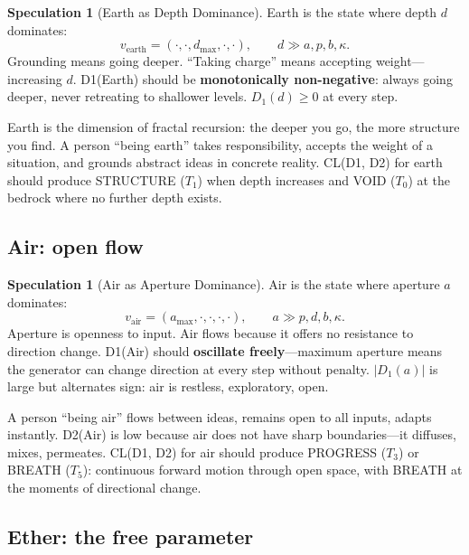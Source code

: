 \documentclass[11pt]{article}
\theoremstyle{definition}
\newtheorem{speculation}[theorem]{Speculation}
\theoremstyle{remark}
\begin{document}
\begin{speculation}[Earth as Depth Dominance]
\label{spec:earth}
Earth is the state where depth $d$ dominates:
\[
  v_{\text{earth}} = (\cdot, \cdot, d_{\max}, \cdot, \cdot), \qquad d \gg a, p, b, \kappa.
\]
Grounding means going deeper.  ``Taking charge'' means accepting weight---increasing
$d$.  D1(Earth) should be \textbf{monotonically non-negative}: always going deeper,
never retreating to shallower levels.  $D_1(d) \geq 0$ at every step.

Earth is the dimension of fractal recursion: the deeper you go, the more structure
you find.  A person ``being earth'' takes responsibility, accepts the weight of a
situation, and grounds abstract ideas in concrete reality.
CL(D1, D2) for earth should produce STRUCTURE ($T_1$) when depth increases and
VOID ($T_0$) at the bedrock where no further depth exists.
\end{speculation}

\subsection{Air: open flow}

\begin{speculation}[Air as Aperture Dominance]
\label{spec:air}
Air is the state where aperture $a$ dominates:
\[
  v_{\text{air}} = (a_{\max}, \cdot, \cdot, \cdot, \cdot), \qquad a \gg p, d, b, \kappa.
\]
Aperture is openness to input.  Air flows because it offers no resistance to
direction change.  D1(Air) should \textbf{oscillate freely}---maximum aperture means
the generator can change direction at every step without penalty.  $|D_1(a)|$ is
large but alternates sign: air is restless, exploratory, open.

A person ``being air'' flows between ideas, remains open to all inputs, adapts
instantly.  D2(Air) is low because air does not have sharp boundaries---it
diffuses, mixes, permeates.
CL(D1, D2) for air should produce PROGRESS ($T_3$) or BREATH ($T_5$): continuous
forward motion through open space, with BREATH at the moments of directional change.
\end{speculation}

\subsection{Ether: the free parameter}
\end{document}
